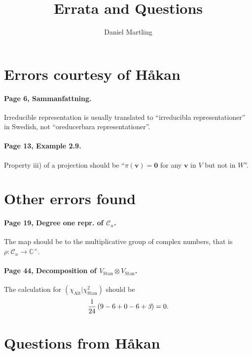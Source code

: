 \documentclass[12pt,a4paper]{article}
\title{Errata and Questions}
\author{Daniel Martling}
\date{}
\theoremstyle{definition}
\theoremstyle{remark}
\numberwithin{equation}{section}
\newcommand{\CC}{\mathbb{C}}
\newcommand{\1}{\mathbf{1}}
\newcommand{\0}{\mathbf{0}}
\newcommand{\Cyc}{\mathcal{C}}%
\newcommand{\Alt}{\text{Alt}}
\newcommand{\Stan}{\text{Stan}}
\newcommand{\vvec}{\mathbf{v}}
\begin{document}
	\maketitle
	
	\section*{Errors courtesy of Håkan}
	
		\paragraph{Page 6, Sammanfattning.} Irreducible representation is usually translated to ``irreducibla representationer'' in Swedish, not ``oreducerbara representationer''.
		
		\paragraph{Page 13, Example 2.9.} Property iii) of a projection should be ``$\pi(\vvec) = \0$ for any $\vvec$ in $V$ but not in $W$''.
		
	\section*{Other errors found}
	
		\paragraph{Page 19, Degree one repr. of $\Cyc_n$.} The map should be to the multiplicative group of complex numbers, that is $\rho: \Cyc_n \rightarrow \CC^\times$.
		
		\paragraph{Page 44, Decomposition of $V_\Stan \otimes V_\Stan$.} The calculation for $(\chi_\Alt|\chi_\Stan^2)$ should be \begin{align*}
			\frac{1}{24}\left(9-6+0-6+{\emph{3}}\right) = 0.
		\end{align*}
		
	\section*{Questions from Håkan}\text
	
\end{document}
